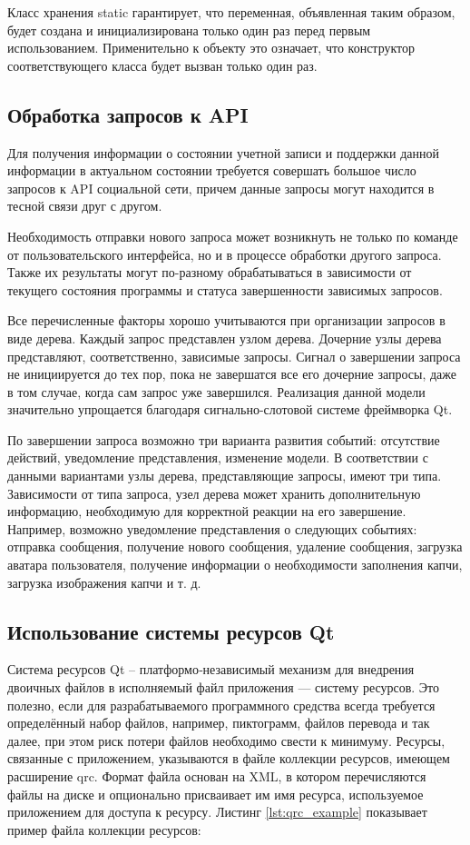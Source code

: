 Класс хранения static гарантирует, что переменная, объявленная таким образом,
будет создана и инициализирована только один раз перед первым использованием.
Применительно к объекту это означает, что конструктор соответствующего
класса будет вызван только один раз.

\subsection{Обработка запросов к API}

Для получения информации о состоянии учетной записи и поддержки данной
информации в актуальном состоянии требуется совершать большое число
запросов к API социальной сети, причем данные запросы могут находится в тесной
связи друг с другом.

Необходимость отправки нового запроса может возникнуть не только по команде от
пользовательского интерфейса, но и в процессе обработки другого запроса.
Также их результаты могут по-разному обрабатываться в зависимости от текущего
состояния программы и статуса завершенности зависимых запросов.

Все перечисленные факторы хорошо учитываются при организации запросов в виде
дерева.
Каждый запрос представлен узлом дерева. Дочерние узлы дерева представляют,
соответственно, зависимые запросы. Сигнал о завершении запроса не инициируется
до тех пор, пока не завершатся все его дочерние запросы, даже в том случае,
когда сам запрос уже завершился.
Реализация данной модели значительно упрощается благодаря сигнально-слотовой
системе фреймворка Qt.

По завершении запроса возможно три варианта развития событий:
отсутствие действий, уведомление представления, изменение модели. В соответствии
с данными вариантами узлы дерева, представляющие запросы, имеют три типа.
Зависимости от типа запроса, узел дерева может хранить дополнительную
информацию, необходимую для корректной реакции на его завершение. Например,
возможно уведомление представления о следующих событиях: отправка сообщения,
получение нового сообщения, удаление сообщения, загрузка аватара пользователя,
получение информации о необходимости заполнения капчи, загрузка изображения
капчи и т. д.

\subsection{Использование системы ресурсов Qt}
Система ресурсов Qt – платформо‑независимый механизм для внедрения двоичных
файлов в исполняемый файл приложения --- систему ресурсов. Это полезно, если для
разрабатываемого программного средства всегда требуется определённый набор
файлов, например, пиктограмм, файлов перевода и так далее, при этом риск потери
файлов необходимо свести к минимуму.
Ресурсы, связанные с приложением, указываются в файле коллекции ресурсов,
имеющем расширение qrc. Формат файла основан на XML, в котором перечисляются
файлы на диске и опционально присваивает им имя ресурса, используемое
приложением для доступа к ресурсу. Листинг \ref{lst:qrc_example} показывает пример файла
коллекции ресурсов:

